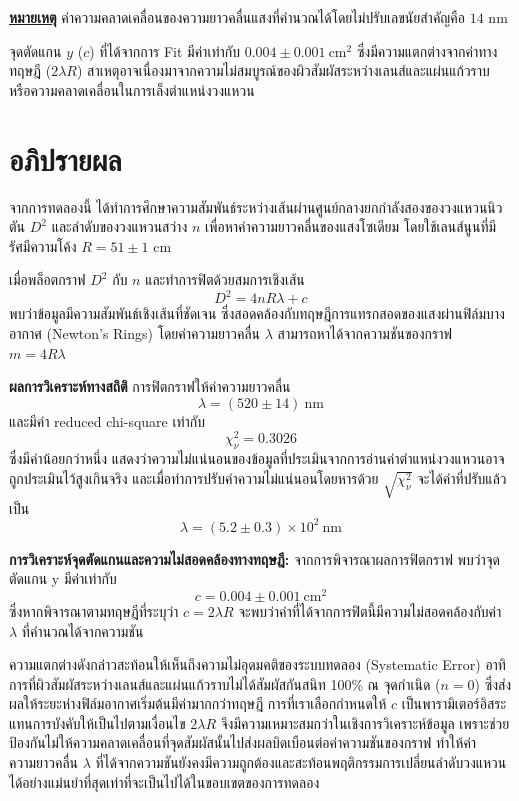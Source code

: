 \documentclass[11pt,a4paper]{article}
\begin{document}
\textbf{\underline{หมายเหตุ}} ค่าความคลาดเคลื่อนของความยาวคลื่นแสงที่คำนวณได้โดยไม่ปรับเลขนัยสำคัญคือ $14$ nm

จุดตัดแกน $y$ ($c$) ที่ได้จากการ Fit มีค่าเท่ากับ $0.004 \pm 0.001\ \text{cm}^2$ ซึ่งมีความแตกต่างจากค่าทางทฤษฎี ($2\lambda R$) สาเหตุอาจเนื่องมาจากความไม่สมบูรณ์ของผิวสัมผัสระหว่างเลนส์และแผ่นแก้วราบ หรือความคลาดเคลื่อนในการเล็งตำแหน่งวงแหวน


\newpage
\section*{อภิปรายผล}

จากการทดลองนี้ ได้ทำการศึกษาความสัมพันธ์ระหว่างเส้นผ่านศูนย์กลางยกกำลังสองของวงแหวนนิวตัน $D^2$ และลำดับของวงแหวนสว่าง $n$ เพื่อหาค่าความยาวคลื่นของแสงโซเดียม โดยใช้เลนส์นูนที่มีรัศมีความโค้ง $R = 51 \pm 1$ cm 

เมื่อพล็อตกราฟ $D^2$ กับ $n$ และทำการฟิตด้วยสมการเชิงเส้น
\[
D^2 = 4nR\lambda + c
\]
พบว่าข้อมูลมีความสัมพันธ์เชิงเส้นที่ชัดเจน ซึ่งสอดคล้องกับทฤษฎีการแทรกสอดของแสงผ่านฟิล์มบางอากาศ (Newton's Rings) โดยค่าความยาวคลื่น $\lambda$ สามารถหาได้จากความชันของกราฟ $m = 4R\lambda$
\newline
\medskip

\textbf{ผลการวิเคราะห์ทางสถิติ} การฟิตกราฟให้ค่าความยาวคลื่น
\[
\lambda = (520 \pm 14)\ \text{nm}
\]
และมีค่า reduced chi-square เท่ากับ
\[
\chi_{\nu}^2 = 0.3026
\]
ซึ่งมีค่าน้อยกว่าหนึ่ง แสดงว่าความไม่แน่นอนของข้อมูลที่ประเมินจากการอ่านค่าตำแหน่งวงแหวนอาจถูกประเมินไว้สูงเกินจริง และเมื่อทำการปรับค่าความไม่แน่นอนโดยหารด้วย $\sqrt{\chi_{\nu}^2}$ จะได้ค่าที่ปรับแล้วเป็น
\[
\lambda = (5.2 \pm 0.3) \times 10^2\ \text{nm}
\]

\newline
\medskip



\textbf{การวิเคราะห์จุดตัดแกนและความไม่สอดคล้องทางทฤษฎี:} 
จากการพิจารณาผลการฟิตกราฟ พบว่าจุดตัดแกน y มีค่าเท่ากับ
\[
c = 0.004 \pm 0.001\ \text{cm}^2 
\]
ซึ่งหากพิจารณาตามทฤษฎีที่ระบุว่า $c = 2\lambda R$ จะพบว่าค่าที่ได้จากการฟิตนี้มีความไม่สอดคล้องกับค่า $\lambda$ ที่คำนวณได้จากความชัน 



ความแตกต่างดังกล่าวสะท้อนให้เห็นถึงความไม่อุดมคติของระบบทดลอง (Systematic Error) อาทิ การที่ผิวสัมผัสระหว่างเลนส์และแผ่นแก้วราบไม่ได้สัมผัสกันสนิท 100\% ณ จุดกำเนิด ($n=0$) ซึ่งส่งผลให้ระยะห่างฟิล์มอากาศเริ่มต้นมีค่ามากกว่าทฤษฎี การที่เราเลือกกำหนดให้ $c$ เป็นพารามิเตอร์อิสระแทนการบังคับให้เป็นไปตามเงื่อนไข $2\lambda R$ จึงมีความเหมาะสมกว่าในเชิงการวิเคราะห์ข้อมูล เพราะช่วยป้องกันไม่ให้ความคลาดเคลื่อนที่จุดสัมผัสนั้นไปส่งผลบิดเบือนต่อค่าความชันของกราฟ ทำให้ค่าความยาวคลื่น $\lambda$ ที่ได้จากความชันยังคงมีความถูกต้องและสะท้อนพฤติกรรมการเปลี่ยนลำดับวงแหวนได้อย่างแม่นยำที่สุดเท่าที่จะเป็นไปได้ในขอบเขตของการทดลอง
\end{document}
